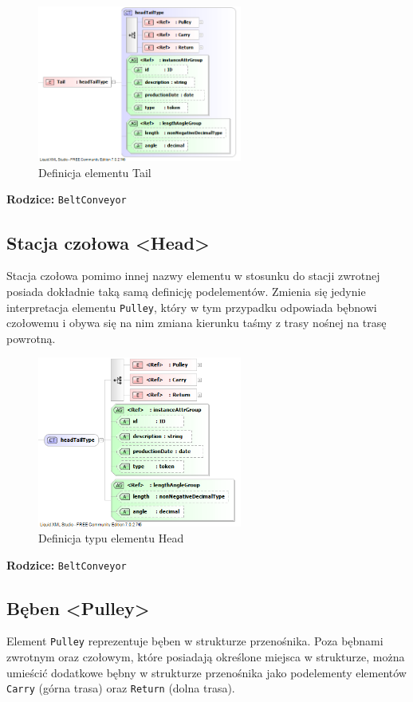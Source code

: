 \documentclass[12pt,a4paper]{article}
\begin{document}
\begin{figure}[H]
  \centering
  \includegraphics[width=0.6\textwidth]{png/liquid/Tail}
  \caption{Definicja elementu Tail}
  \label{fig:tail-xsd}
\end{figure}

\noindent\textbf{Rodzice:} \texttt{BeltConveyor}


\subsection{Stacja czołowa <Head>}
Stacja czołowa pomimo innej nazwy elementu w stosunku do stacji zwrotnej posiada
dokładnie taką samą definicję podelementów.  Zmienia się jedynie interpretacja
elementu {\tt Pulley}, który w tym przypadku odpowiada bębnowi czołowemu i obywa
się na nim zmiana kierunku taśmy z trasy nośnej na trasę powrotną.

\begin{figure}[H]
  \centering
  \includegraphics[width=0.6\textwidth]{png/liquid/headTailType}
  \caption{Definicja typu elementu Head}
  \label{fig:headTailType-xsd}
\end{figure}

\noindent\textbf{Rodzice:} \texttt{BeltConveyor}


\subsection{Bęben <Pulley>}
Element {\tt Pulley} reprezentuje bęben w strukturze przenośnika.  Poza bębnami
zwrotnym oraz czołowym, które posiadają określone miejsca w strukturze, można
umieścić dodatkowe bębny w strukturze przenośnika jako podelementy elementów
{\tt Carry} (górna trasa) oraz {\tt Return} (dolna trasa).
\end{document}

